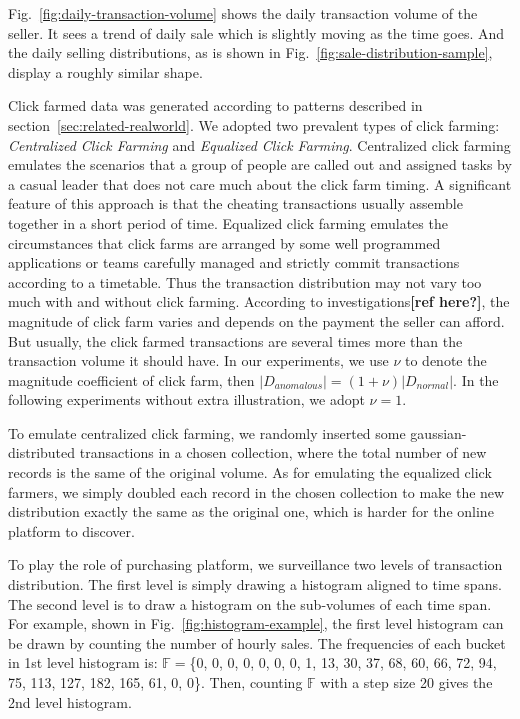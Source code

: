 \documentclass[a4paper]{IEEEtran}
\begin{document}
			Fig.~\ref{fig:daily-transaction-volume} shows the daily transaction volume of the seller. It sees a trend of daily sale which is slightly moving as the time goes. And the daily selling distributions, as is shown in Fig.~\ref{fig:sale-distribution-sample}, display a roughly similar shape.
			
			Click farmed data was generated according to patterns described in section~\ref{sec:related-realworld}. We adopted two prevalent types of click farming: \textit{Centralized Click Farming} and \textit{Equalized Click Farming}. Centralized click farming emulates the scenarios that a group of people are called out and assigned tasks by a casual leader that does not care much about the click farm timing. A significant feature of this approach is that the cheating transactions usually assemble together in a short period of time. Equalized click farming emulates the circumstances that click farms are arranged by some well programmed applications or teams carefully managed and strictly commit transactions according to a timetable. Thus the transaction distribution may not vary too much with and without click farming. According to investigations\textbf{[ref here?]}, the magnitude of click farm varies and depends on the payment the seller can afford. But usually, the click farmed transactions are several times more than the transaction volume it should have. In our experiments, we use $\nu$ to denote the magnitude coefficient of click farm, then $|D_{anomalous}| = (1 + \nu)|D_{normal}|$. In the following experiments without extra illustration, we adopt $\nu = 1$.
			
			To emulate centralized click farming, we randomly inserted some gaussian-distributed transactions in a chosen collection, where the total number of new records is the same of the original volume. As for emulating the equalized click farmers, we simply doubled each record in the chosen collection to make the new distribution exactly the same as the original one, which is harder for the online platform to discover.
			
			To play the role of purchasing platform, we surveillance two levels of transaction distribution. The first level is simply drawing a histogram aligned to time spans. The second level is to draw a histogram on the sub-volumes of each time span. For example, shown in Fig.~\ref{fig:histogram-example}, the first level histogram can be drawn by counting the number of hourly sales. The frequencies of each bucket in 1st level histogram is: $\mathbb{F}=$\{0, 0, 0, 0, 0, 0, 0, 1, 13, 30, 37, 68, 60, 66, 72, 94, 75, 113, 127, 182, 165, 61, 0, 0\}. Then, counting $\mathbb{F}$ with a step size 20 gives the 2nd level histogram.
			
\end{document}
